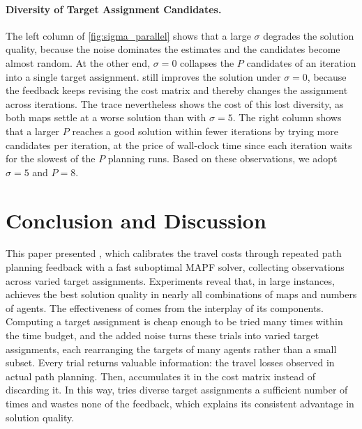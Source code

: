 \paragraph{Diversity of Target Assignment Candidates.}

The left column of \cref{fig:sigma_parallel} shows that a large $\sigma$ degrades the solution quality, because the noise dominates the estimates and the candidates become almost random.
At the other end, $\sigma=0$ collapses the $P$ candidates of an iteration into a single target assignment.
\planner still improves the solution under $\sigma=0$, because the feedback keeps revising the cost matrix and thereby changes the assignment across iterations.
The trace nevertheless shows the cost of this lost diversity, as both maps settle at a worse solution than with $\sigma=5$.
The right column shows that a larger $P$ reaches a good solution within fewer iterations by trying more candidates per iteration, at the price of wall-clock time since each iteration waits for the slowest of the $P$ planning runs.
Based on these observations, we adopt $\sigma = 5$ and $P = 8$.

\section{Conclusion and Discussion}
This paper presented \planner, which calibrates the travel costs through repeated path planning feedback with a fast suboptimal MAPF solver, collecting observations across varied target assignments.
Experiments reveal that, in large instances, \planner achieves the best solution quality in nearly all combinations of maps and numbers of agents.
The effectiveness of \planner comes from the interplay of its components.
Computing a target assignment is cheap enough to be tried many times within the time budget, and the added noise turns these trials into varied target assignments, each rearranging the targets of many agents rather than a small subset.
Every trial returns valuable information: the travel losses observed in actual path planning.
Then, \planner accumulates it in the cost matrix instead of discarding it.
In this way, \planner tries diverse target assignments a sufficient number of times and wastes none of the feedback, which explains its consistent advantage in solution quality.
